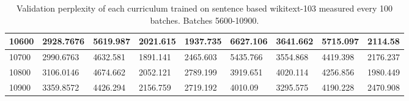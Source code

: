 \documentclass [11pt, proquest] {uwthesis}[2020/12/20]
\begin{document}
\begin{table}[]
\begin{tiny}
\begin{tabular}{|l|l|l|l|l|l|l|l|l|}
10600 & 2928.7676 & 5619.987 & 2021.615 & 1937.735 & 6627.106 & 3641.662 & 5715.097 & 2114.58 \\ \hline
10700 & 2990.6763 & 4632.581 & 1891.141 & 2465.603 & 5435.766 & 3554.868 & 4419.398 & 2176.237 \\ \hline
10800 & 3106.0146 & 4674.662 & 2052.121 & 2789.199 & 3919.651 & 4020.114 & 4256.856 & 1980.449 \\ \hline
10900 & 3359.8572 & 4426.294 & 2156.759 & 2719.192 & 4010.09 & 3295.575 & 4190.228 & 2470.908 \\ \hline
\end{tabular}
\end{tiny}
\caption{Validation perplexity of each curriculum trained on sentence based wikitext-103 measured every 100 batches. Batches 5600-10900.}
\label{tab:wikitext-103-sentence-2}
\end{table}
\end{document}
